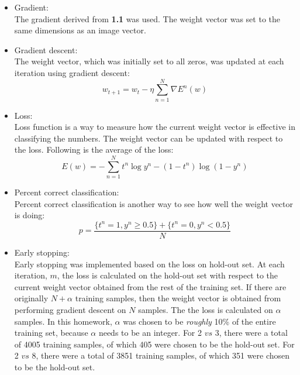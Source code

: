 \documentclass[11pt,twoside]{article}
\begin{document}
\begin{itemize}
\item Gradient:\\
The gradient derived from \textbf{1.1} was used. The weight vector was set to the same dimensions as an image vector.\\

\item Gradient descent:\\
The weight vector, which was initially set to all zeros, was updated at each iteration using gradient descent:\\
\begin{equation}
w_{t+1} = w_{t} - \eta \sum_{n = 1}^{N} \nabla E^{n}(w)
\end{equation}

\item Loss:\\
Loss function is a way to measure how the current weight vector is effective in classifying the numbers. The weight vector can be updated with respect to the loss. Following is the average of the loss:\\
\begin{equation}
E(w) = -\sum_{n = 1}^{N} t^{n}\log y^{n} - (1 - t^{n})\log (1 - y^n)
\end{equation}

\item Percent correct classification:\\
Percent correct classification is another way to see how well the weight vector is doing:\\
\begin{equation}
p = \frac{\lbrace t^{n} = 1, y^{n} \geq 0.5\rbrace + \lbrace t^{n} = 0, y^{n} < 0.5 \rbrace}{N}
\end{equation}

\item Early stopping:\\
Early stopping was implemented based on the loss on hold-out set. At each iteration, $m$, the loss is calculated on the hold-out set with respect to the current weight vector obtained from the rest of the training set. If there are originally $N + \alpha$ training samples, then the weight vector is obtained from performing gradient descent on $N$ samples. The the loss is calculated on $\alpha$ samples. In this homework, $\alpha$ was chosen to be \textit{roughly} 10\% of the entire training set, because $\alpha$ needs to be an integer. For 2 $vs$ 3, there were a total of 4005 training samples, of which 405 were chosen to be the hold-out set. For 2 $vs$ 8, there were a total of 3851 training samples, of which 351 were chosen to be the hold-out set.\\


\end{itemize}
\end{document}
